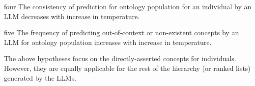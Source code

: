 \documentclass[a4paper,colorinlistoftodos]{article}
\begin{document}
\begin{hypothesis}{}{four}
  The consistency of prediction for ontology population for an individual by
  an LLM decreases with increase in temperature.
\end{hypothesis}

\begin{hypothesis}{}{five}
  The frequency of predicting out-of-context or non-existent concepts by an
  LLM for ontology population increases with increase in temperature.
\end{hypothesis}

The above hypotheses focus on the directly-asserted concepts for
individuals. However, they are equally applicable for the rest of the 
hierarchy (or ranked lists) generated by the LLMs.



\end{document}

